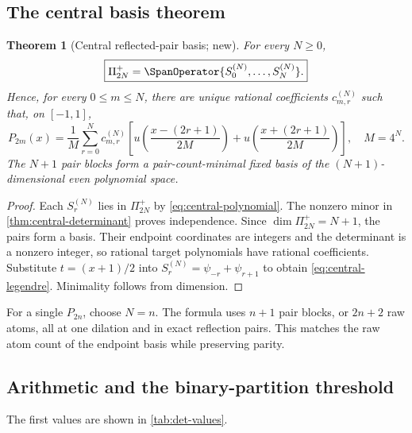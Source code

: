 \documentclass[11pt,oneside]{article}
\numberwithin{equation}{section}
\newtheorem{theorem}{Theorem}[section]
\theoremstyle{definition}
\theoremstyle{remark}
\begin{document}
\subsection{The central basis theorem}

\begin{theorem}[Central reflected-pair basis; new]
\label{thm:central-basis}
For every $N\ge0$,
\begin{equation}
 \boxed{
 \Pi_{2N}^{+}=\SpanOperator\{S_0^{(N)},\ldots,S_N^{(N)}\}.}
 \label{eq:central-basis}
\end{equation}
Hence, for every $0\le m\le N$, there are unique rational coefficients
$c_{m,r}^{(N)}$ such that, on $[-1,1]$,
\begin{equation}
 \boxed{
 P_{2m}(x)=\frac1M\sum_{r=0}^{N}c_{m,r}^{(N)}
 \left[
 u\!\left(\frac{x-(2r+1)}{2M}\right)
 +u\!\left(\frac{x+(2r+1)}{2M}\right)
 \right],\quad M=4^N.}
 \label{eq:central-legendre}
\end{equation}
The $N+1$ pair blocks form a pair-count-minimal fixed basis of the
$(N+1)$-dimensional even polynomial space.
\end{theorem}

\begin{proof}
Each $S_r^{(N)}$ lies in $\Pi_{2N}^+$ by
\eqref{eq:central-polynomial}.  The nonzero minor in
\cref{thm:central-determinant} proves independence.  Since
$\dim\Pi_{2N}^+=N+1$, the pairs form a basis.  Their endpoint coordinates are
integers and the determinant is a nonzero integer, so rational target
polynomials have rational coefficients.  Substitute $t=(x+1)/2$ into
$S_r^{(N)}=\psi_{-r}+\psi_{r+1}$ to obtain
\eqref{eq:central-legendre}.  Minimality follows from dimension.
\end{proof}

For a single $P_{2n}$, choose $N=n$.  The formula uses $n+1$ pair blocks, or
$2n+2$ raw atoms, all at one dilation and in exact reflection pairs.  This
matches the raw atom count of the endpoint basis while preserving parity.

\subsection{Arithmetic and the binary-partition threshold}

The first values are shown in \cref{tab:det-values}.
\end{document}
